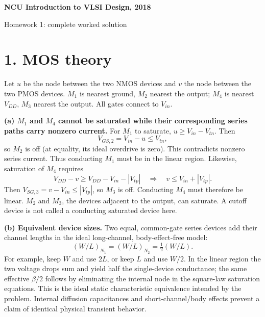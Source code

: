 \documentclass[11pt]{article}
\newcommand{\mos}[4]{\begin{scope}[shift={(#1,#2)}]
\draw (0,.24)--(0,-.24);
\draw (0,.20)--(.25,.20)--(.25,.5);
\draw (0,-.20)--(.25,-.20)--(.25,-.5);
\draw (-.16,.23)--(-.16,-.23);
\ifnum#4=1\draw (-.26,0) circle (.06);\draw (-.75,0)--(-.32,0);\else\draw (-.75,0)--(-.16,0);\fi
\node[anchor=east,font=\small] at (-.76,0) {$#3$};
\end{scope}}
\newcommand{\ground}[2]{\draw (#1,#2)--(#1,{#2-.12});\draw ({#1-.17},{#2-.12})--({#1+.17},{#2-.12});\draw ({#1-.11},{#2-.20})--({#1+.11},{#2-.20});}
\newcommand{\rail}[3]{\draw (#1,#2)--(#1,{#2+.15});\node[above,font=\small] at (#1,{#2+.15}) {$#3$};}
\newcommand{\outputnode}[3]{\fill (#1,#2) circle (.04);\draw (#1,#2)--({#1+.7},#2) node[right] {$#3$};}
\begin{document}
\begin{center}{\Large\bfseries NCU Introduction to VLSI Design, 2018}\par{\large Homework 1: complete worked solution}\end{center}
\section*{1. MOS theory}
Let $u$ be the node between the two NMOS devices and $v$ the node between the two PMOS devices. $M_1$ is nearest ground, $M_2$ nearest the output; $M_4$ is nearest $V_{DD}$, $M_3$ nearest the output. All gates connect to $V_{in}$.
\begin{center}\end{center}

\textbf{(a) $M_1$ and $M_4$ cannot be saturated while their corresponding series paths carry nonzero current.}
For $M_1$ to saturate, $u\ge V_{in}-V_{tn}$. Then
\[
 V_{GS,2}=V_{in}-u\le V_{tn},
\]
so $M_2$ is off (at equality, its ideal overdrive is zero). This contradicts nonzero series current. Thus conducting $M_1$ must be in the linear region. Likewise, saturation of $M_4$ requires
\[
 V_{DD}-v\ge V_{DD}-V_{in}-|V_{tp}| \quad\Longrightarrow\quad v\le V_{in}+|V_{tp}|.
\]
Then $V_{SG,3}=v-V_{in}\le |V_{tp}|$, so $M_3$ is off. Conducting $M_4$ must therefore be linear. $M_2$ and $M_3$, the devices adjacent to the output, can saturate. A cutoff device is not called a conducting saturated device here.

\textbf{(b) Equivalent device sizes.} Two equal, common-gate series devices add their channel lengths in the ideal long-channel, body-effect-free model:
\[
 \boxed{(W/L)_{N_1}=(W/L)_{N_2}=\tfrac12(W/L).}
\]
For example, keep $W$ and use $2L$, or keep $L$ and use $W/2$. In the linear region the two voltage drops sum and yield half the single-device conductance; the same effective $\beta/2$ follows by eliminating the internal node in the square-law saturation equations. This is the ideal static characteristic equivalence intended by the problem. Internal diffusion capacitances and short-channel/body effects prevent a claim of identical physical transient behavior.
\end{document}

